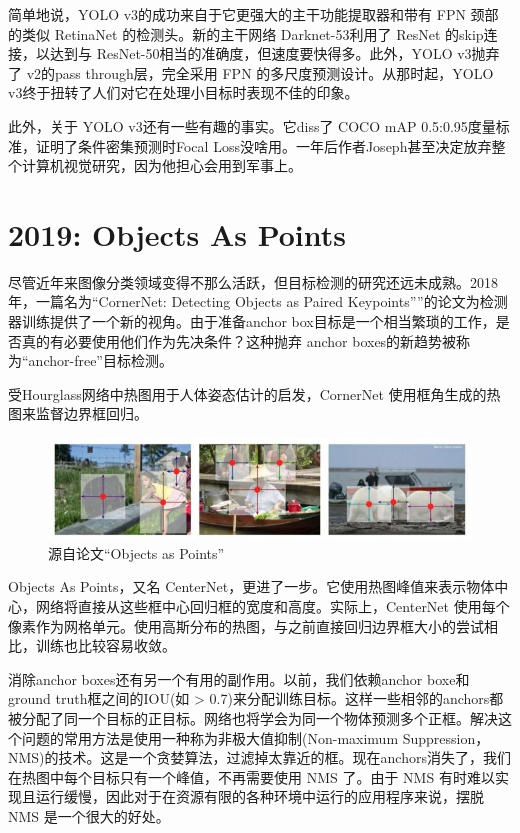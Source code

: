 \documentclass{article}
\begin{document}
	  简单地说，YOLO v3的成功来自于它更强大的主干功能提取器和带有 FPN 颈部的类似 RetinaNet 的检测头。新的主干网络 Darknet-53利用了 ResNet 的skip连接，以达到与 ResNet-50相当的准确度，但速度要快得多。此外，YOLO v3抛弃了 v2的pass through层，完全采用 FPN 的多尺度预测设计。从那时起，YOLO v3终于扭转了人们对它在处理小目标时表现不佳的印象。
	  
	  此外，关于 YOLO v3还有一些有趣的事实。它diss了 COCO mAP 0.5:0.95度量标准，证明了条件密集预测时Focal Loss没啥用。一年后作者Joseph甚至决定放弃整个计算机视觉研究，因为他担心会用到军事上。
	 
	\section{2019: Objects As Points}
	尽管近年来图像分类领域变得不那么活跃，但目标检测的研究还远未成熟。2018年，一篇名为“CornerNet: Detecting Objects as Paired Keypoints””的论文为检测器训练提供了一个新的视角。由于准备anchor box目标是一个相当繁琐的工作，是否真的有必要使用他们作为先决条件？这种抛弃 anchor boxes的新趋势被称为“anchor-free”目标检测。
	
	受Hourglass网络中热图用于人体姿态估计的启发，CornerNet 使用框角生成的热图来监督边界框回归。
	
	
	\begin{figure}[htpb]
		\centering
		\includegraphics[width=\linewidth]{detectfig/14.jpg}
		\caption{源自论文“Objects as Points”}	
	\end{figure}

	Objects As Points，又名 CenterNet，更进了一步。它使用热图峰值来表示物体中心，网络将直接从这些框中心回归框的宽度和高度。实际上，CenterNet 使用每个像素作为网格单元。使用高斯分布的热图，与之前直接回归边界框大小的尝试相比，训练也比较容易收敛。
	
	消除anchor boxes还有另一个有用的副作用。以前，我们依赖anchor boxe和ground truth框之间的IOU(如 > 0.7)来分配训练目标。这样一些相邻的anchors都被分配了同一个目标的正目标。网络也将学会为同一个物体预测多个正框。解决这个问题的常用方法是使用一种称为非极大值抑制(Non-maximum Suppression，NMS)的技术。这是一个贪婪算法，过滤掉太靠近的框。现在anchors消失了，我们在热图中每个目标只有一个峰值，不再需要使用 NMS 了。由于 NMS 有时难以实现且运行缓慢，因此对于在资源有限的各种环境中运行的应用程序来说，摆脱 NMS 是一个很大的好处。
	
\end{document}

